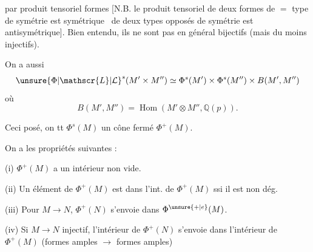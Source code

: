par produit tensoriel  formes [N.B. le produit tensoriel de deux formes  de $=$ type de symétrie est symétrique \textendash\ de deux types opposés de symétrie est antisymétrique]. Bien entendu, ils ne sont pas en général bijectifs (mais du moins injectifs).

On a aussi
\[
\unsure{\Phi|\mathscr{L}|\mathcal{L}}^s(M'\times M'')\simeq
\Phi^s(M')\times\Phi^s(M'')\times B(M',M'')
\]
où
\[
B(M',M'')=\operatorname{Hom}(M'\otimes M'',\mathbb{Q}(p)).
\]

Ceci posé, on   tt $\Phi^s(M)$ un cône  fermé $\Phi^+(M)$.

On a les propriétés suivantes :

(i) $\Phi^+(M)$ a un intérieur non vide.

(ii) Un élément de $\Phi^+(M)$ est dans l'int. de $\Phi^+(M)$ ssi il est non dég.


(iii) Pour $M\to N$, $\Phi^+(N)$ s'envoie dans $\Phi^{\unsure{+|e}}(M)$.

(iv)  Si $M\longrightarrow N$ injectif,  l'intérieur de $\Phi^+(N)$ s'envoie dans l'intérieur de $\Phi^+(M)$ (formes amples $\longrightarrow$ formes amples)
